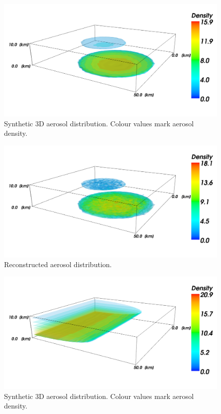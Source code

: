\documentclass[10pt,twocolumn,letterpaper]{article}
\newcommand{\yoavcomment}[1]{}
\renewcommand{\yoavcomment}[1]{#1} %
\begin{document}
\begin{figure}
  \centering
  \yoavcomment{\includegraphics[width=\columnwidth]{images/orig1}}
  \caption{Synthetic 3D aerosol distribution. Colour values mark
    aerosol density.}
  \label{fig:synth-atmo}
\end{figure}

\begin{figure}
  \centering
  \yoavcomment{\includegraphics[width=\columnwidth]{images/recon1}}
  \caption{Reconstructed aerosol distribution.}
  \label{fig:synth-result}
\end{figure}

\begin{figure}
  \centering
  \yoavcomment{\includegraphics[width=\columnwidth]{images/orig2}}
  \caption{Synthetic 3D aerosol distribution. Colour values mark
    aerosol density.}
  \label{fig:synth-atmo2}
\end{figure}
\end{document}
